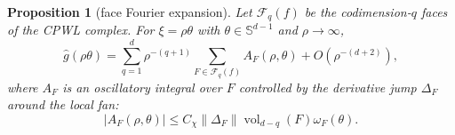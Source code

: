 \documentclass[10pt,twocolumn]{article}
\newtheorem{proposition}{Proposition}
\newcommand{\1}{\mathbf{1}}
\newcommand{\wh}{\widehat}
\begin{document}
\begin{proposition}[face Fourier expansion]
\label{prop:face-fourier}
Let $\mathcal F_q(f)$ be the codimension-$q$ faces of the CPWL complex.  For $\xi=\rho\theta$ with $\theta\in\mathbb S^{d-1}$ and $\rho\to\infty$,
\begin{equation}\label{eq:facefourier}
\wh g(\rho\theta)
=
\sum_{q=1}^{d}\rho^{-(q+1)}
\sum_{F\in\mathcal F_q(f)}
A_F(\rho,\theta)
+O(\rho^{-(d+2)}),
\end{equation}
where $A_F$ is an oscillatory integral over $F$ controlled by the derivative jump $\Delta_F$ around the local fan:
\begin{equation}
|A_F(\rho,\theta)|
\le C_\chi\|\Delta_F\|\operatorname{vol}_{d-q}(F)\omega_F(\theta).
\end{equation}
\end{proposition}
\end{document}
